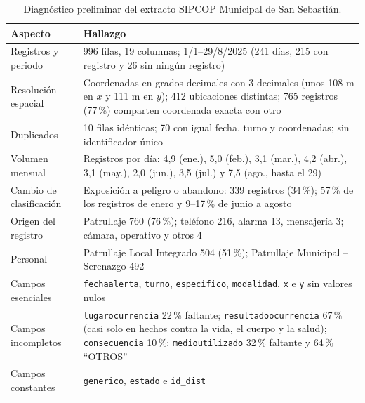 \begin{table}[H]
\centering
\caption{Diagnóstico preliminar del extracto SIPCOP Municipal de San Sebastián.}
\label{tab:diagnostico}
\begingroup\singlespacing\footnotesize
\begin{tabular}{@{}p{4.4cm}p{9.6cm}@{}}
\toprule
\textbf{Aspecto} & \textbf{Hallazgo} \\
\midrule
Registros y periodo & 996 filas, 19 columnas; 1/1--29/8/2025 (241 días, 215 con registro y 26 sin ningún registro) \\
\addlinespace
Resolución espacial & Coordenadas en grados decimales con 3 decimales (unos 108 m en $x$ y 111 m en $y$); 412 ubicaciones distintas; 765 registros (77\,\%) comparten coordenada exacta con otro \\
\addlinespace
Duplicados & 10 filas idénticas; 70 con igual fecha, turno y coordenadas; sin identificador único \\
\addlinespace
Volumen mensual & Registros por día: 4,9 (ene.), 5,0 (feb.), 3,1 (mar.), 4,2 (abr.), 3,1 (may.), 2,0 (jun.), 3,5 (jul.) y 7,5 (ago., hasta el 29) \\
\addlinespace
Cambio de clasificación & Exposición a peligro o abandono: 339 registros (34\,\%); 57\,\% de los registros de enero y 9--17\,\% de junio a agosto \\
\addlinespace
Origen del registro & Patrullaje 760 (76\,\%); teléfono 216, alarma 13, mensajería 3; cámara, operativo y otros 4 \\
\addlinespace
Personal & Patrullaje Local Integrado 504 (51\,\%); Patrullaje Municipal -- Serenazgo 492 \\
\addlinespace
Campos esenciales & \texttt{fechaalerta}, \texttt{turno}, \texttt{especifico}, \texttt{modalidad}, \texttt{x} e \texttt{y} sin valores nulos \\
\addlinespace
Campos incompletos & \texttt{lugarocurrencia} 22\,\% faltante; \texttt{resultadoocurrencia} 67\,\% (casi solo en hechos contra la vida, el cuerpo y la salud); \texttt{consecuencia} 10\,\%; \texttt{medioutilizado} 32\,\% faltante y 64\,\% ``OTROS'' \\
\addlinespace
Campos constantes & \texttt{generico}, \texttt{estado} e \texttt{id\_dist} \\
\bottomrule
\end{tabular}
\endgroup
{}
\end{table}

